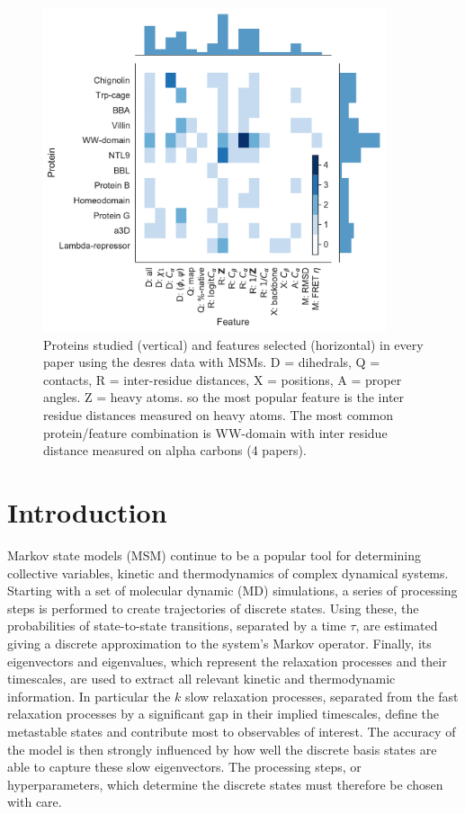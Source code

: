 \documentclass{article}
\begin{document}
\begin{figure}
    \centering
    \includegraphics[width=0.9\textwidth]{figures/background_features.pdf}
    \caption{Proteins studied (vertical) and features selected (horizontal) in every paper using the desres data with MSMs.  D = dihedrals, Q = contacts, R = inter-residue distances, X = positions, A = proper angles.  Z = heavy atoms.  so the most popular feature is the inter residue  distances measured on heavy atoms. The most common protein/feature combination is WW-domain with inter residue distance measured on alpha carbons (4 papers). }
    \label{fig:my_label}
\end{figure}


\section{Introduction}

Markov state models (MSM) continue to be a popular tool for determining collective variables, kinetic and thermodynamics of complex dynamical systems. Starting with a set of molecular dynamic (MD) simulations, a series of processing steps is performed to create trajectories of discrete states. Using these, the probabilities of state-to-state transitions, separated by a time $\tau$, are estimated giving a discrete approximation to the system's Markov operator. Finally, its eigenvectors and eigenvalues, which represent the relaxation processes and their timescales, are used to extract all relevant kinetic and thermodynamic information. In particular the $k$ slow relaxation processes, separated from the fast relaxation processes by a significant gap in their implied timescales, define the metastable states and contribute most to observables of interest. The accuracy of the model is then strongly influenced by how well the discrete basis states are able to capture these slow eigenvectors. The processing steps, or hyperparameters, which determine the discrete states must therefore be chosen with care. 
\end{document}
